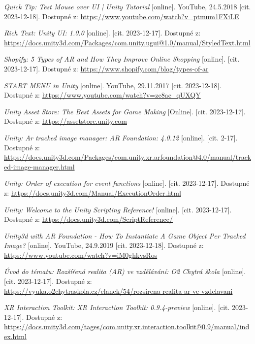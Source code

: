 \documentclass[12pt, a4paper,
twoside,        %
openright
]{report}
\begin{document}
\begin{thebibliography}{99}
 \textit{Quick Tip: Test Mouse over UI | Unity Tutorial} [online]. YouTube, 24.5.2018 [cit. 2023-12-18]. Dostupné z: \url{https://www.youtube.com/watch?v=ptmum1FXiLE}

\textit{Rich Text: Unity UI: 1.0.0} [online]. [cit. 2023-12-17]. Dostupné z: \url{https://docs.unity3d.com/Packages/com.unity.ugui@1.0/manual/StyledText.html}

\textit{Shopify: 5 Types of AR and How They Improve Online Shopping} [online]. [cit. 2023-12-17]. Dostupné z: \url{https://www.shopify.com/blog/types-of-ar}	

 \textit{START MENU in Unity} [online]. YouTube, 29.11.2017 [cit. 2023-12-18]. Dostupné z: \url{https://www.youtube.com/watch?v=zc8ac_qUXQY}

\textit{Unity Asset Store: The Best Assets for Game Making} [Online]. [cit. 2023-12-17]. Dostupné z: \url{https://assetstore.unity.com}

\textit{Unity: Ar tracked image manager: AR Foundation: 4.0.12} [online]. [cit. 2-17]. Dostupné z: \url{https://docs.unity3d.com/Packages/com.unity.xr.arfoundation@4.0/manual/tracked-image-manager.html}

\textit{Unity: Order of execution for event functions} [online]. [cit. 2023-12-17]. Dostupné z: \url{https://docs.unity3d.com/Manual/ExecutionOrder.html}

\textit{Unity: Welcome to the Unity Scripting Reference!} [online]. [cit. 2023-12-17]. Dostupné z: \url{https://docs.unity3d.com/ScriptReference/}

 \textit{Unity3d with AR Foundation - How To Instantiate A Game Object Per Tracked Image?} [online]. YouTube, 24.9.2019 [cit. 2023-12-18]. Dostupné z: \url{https://www.youtube.com/watch?v=iM0ghkvsRos}

\textit{Úvod do tématu: Rozšířená realita (AR) ve vzdělávání: O2 Chytrá škola} [online]. [cit. 2023-12-17]. Dostupné z: \url{https://vyuka.o2chytraskola.cz/clanek/54/rozsirena-realita-ar-ve-vzdelavani}

\textit{XR Interaction Toolkit: XR Interaction Toolkit: 0.9.4-preview} [online]. [cit. 2023-12-17]. Dostupné z: \url{https://docs.unity3d.com/tages/com.unity.xr.interaction.toolkit@0.9/manual/index.html}



\end{thebibliography}
\newpage
\listoffigures
\end{document}
